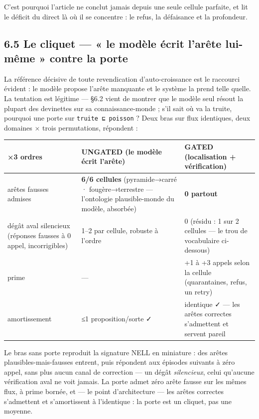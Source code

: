 \documentclass[11pt]{article}
\begin{document}
C'est pourquoi l'article ne conclut jamais depuis une seule cellule parfaite, et lit le déficit du direct là où il se concentre : le refus, la défaisance et la profondeur.

\subsection*{6.5 Le cliquet — « le modèle écrit l'arête lui-même » contre la porte}

La référence décisive de toute revendication d'auto-croissance est le raccourci évident : le modèle propose l'arête manquante et le système la prend telle quelle. La tentation est légitime — §6.2 vient de montrer que le modèle seul résout la plupart des devinettes sur sa connaissance-monde ; s'il sait où va la truite, pourquoi une porte sur \texttt{truite ⊑ poisson} ? Deux bras sur flux identiques, deux domaines × trois permutations, répondent :

\begin{center}\small\begin{tabular}{lll}\toprule
×3 ordres & UNGATED (le modèle écrit l'arête) & GATED (localisation + vérification) \\ \midrule
arêtes fausses admises & \textbf{6/6 cellules} (pyramide→carré · fougère→terrestre — l'ontologie plausible-monde du modèle, absorbée) & \textbf{0 partout} \\
dégât aval silencieux (réponses fausses à 0 appel, incorrigibles) & 1–2 par cellule, robuste à l'ordre & 0 (résidu : 1 sur 2 cellules — le trou de vocabulaire ci-dessous) \\
prime & — & +1 à +3 appels selon la cellule (quarantaines, refus, un retry) \\
amortissement & ≤1 proposition/sorte ✓ & identique ✓ — les arêtes correctes s'admettent et servent pareil \\
\bottomrule\end{tabular}\end{center}

Le bras sans porte reproduit la signature NELL en miniature : des arêtes plausibles-mais-fausses entrent, puis répondent aux épisodes suivants à zéro appel, sans plus aucun canal de correction — un dégât \emph{silencieux}, celui qu'aucune vérification aval ne voit jamais. La porte admet zéro arête fausse sur les mêmes flux, à prime bornée, et — le point d'architecture — les arêtes correctes s'admettent et s'amortissent à l'identique : la porte est un cliquet, pas une moyenne.
\end{document}
